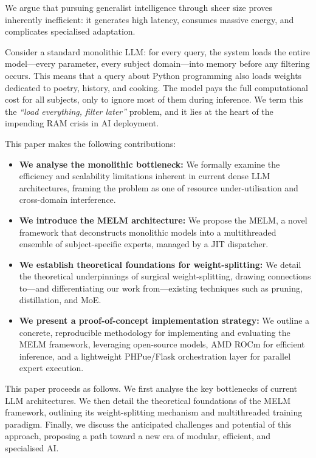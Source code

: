 \documentclass[conference]{IEEEtran}
\begin{document}
	We argue that pursuing generalist intelligence through sheer size proves inherently inefficient: it generates high latency, consumes massive energy, and complicates specialised adaptation. 

	Consider a standard monolithic LLM: for every query, the system loads the entire model—every parameter, every subject domain—into memory before any filtering occurs. This means that a query about Python programming also loads weights dedicated to poetry, history, and cooking. The model pays the full computational cost for all subjects, only to ignore most of them during inference. We term this the \textit{``load everything, filter later''} problem, and it lies at the heart of the impending RAM crisis in AI deployment.

	This paper makes the following contributions:
	\begin{itemize}
		\item \textbf{We analyse the monolithic bottleneck:} We formally examine the efficiency and scalability limitations inherent in current dense LLM architectures, framing the problem as one of resource under-utilisation and cross-domain interference.
		\item \textbf{We introduce the MELM architecture:} We propose the MELM, a novel framework that deconstructs monolithic models into a multithreaded ensemble of subject-specific experts, managed by a JIT dispatcher.
		\item \textbf{We establish theoretical foundations for weight-splitting:} We detail the theoretical underpinnings of surgical weight-splitting, drawing connections to—and differentiating our work from—existing techniques such as pruning, distillation, and MoE.
		\item \textbf{We present a proof-of-concept implementation strategy:} We outline a concrete, reproducible methodology for implementing and evaluating the MELM framework, leveraging open-source models, AMD ROCm for efficient inference, and a lightweight PHPue/Flask orchestration layer for parallel expert execution.
	\end{itemize}

	This paper proceeds as follows. We first analyse the key bottlenecks of current LLM architectures. We then detail the theoretical foundations of the MELM framework, outlining its weight-splitting mechanism and multithreaded training paradigm. Finally, we discuss the anticipated challenges and potential of this approach, proposing a path toward a new era of modular, efficient, and specialised AI.
\end{document}
